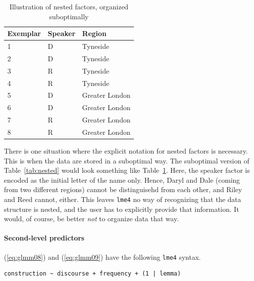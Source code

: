 \documentclass[a4paper,12pt]{article}
\begin{document}
\begin{table}
  \centering
  \begin{tabular}{lll}
    \toprule
    \textbf{Exemplar} & \textbf{Speaker}  & \textbf{Region}        \\
    \midrule
                    1 &           D      &         Tyneside       \\
                    2 &           D      &         Tyneside       \\
                    3 &           R      &         Tyneside       \\
                    4 &           R      &         Tyneside       \\
                    5 &           D      &         Greater London \\
                    6 &           D      &         Greater London \\
                    7 &           R      &         Greater London \\
                    8 &           R      &         Greater London \\
    \bottomrule
  \end{tabular}
  \caption{Illustration of nested factors, organized suboptimally}
  \label{tab:nestedwrong}
\end{table}

There is one situation where the explicit notation for nested factors is necessary.
This is when the data are stored in a suboptimal way.
The suboptimal version of Table~\ref{tab:nested} would look something like Table~\ref{tab:nestedwrong}.
Here, the speaker factor is encoded as the initial letter of the name only.
Hence, Daryl and Dale (coming from two different regions) cannot be distinguisehd from each other, and Riley and Reed cannot, either.
This leaves \texttt{lme4} no way of recognizing that the data structure is nested, and the user has to explicitly provide that information.
It would, of course, be better \textit{not} to organize data that way.

\paragraph{Second-level predictors}

(\ref{eq:glmm08}) and (\ref{eq:glmm09}) have the following \texttt{lme4} syntax.

\vspace{0.5\baselineskip}

\begin{lstlisting}
construction ~ discourse + frequency + (1 | lemma)
\end{lstlisting}
\end{document}
